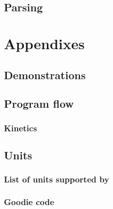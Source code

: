 \documentclass[twoside]{report}
\begin{document}
\chapter{Parsing}

\appendix
\part{Appendixes}
\chapter{Demonstrations}
\label{demo}


\chapter{Program flow}
\label{progflow}

\section{Kinetics}
\label{progflow:kinetics}


\chapter{Units}
\section{List of units supported by \Antioch}
\label{list_units}


\section{Goodie code}
\label{unit_goodie}
{\footnotesize

}



\end{document}
